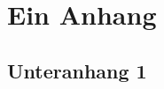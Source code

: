 \documentclass[%
english, ngerman,%
twoside, %
toc=bib,
]{isw_smb_diss} %
\numberwithin{equation}{chapter} %
\begin{document}

\makeatletter
\renewcommand{\@seccntformat}[1]{Anhang \csname the#1\endcsname\quad} %
\makeatother

\section{Ein Anhang}
\subsection{Unteranhang 1}
\end{document}
